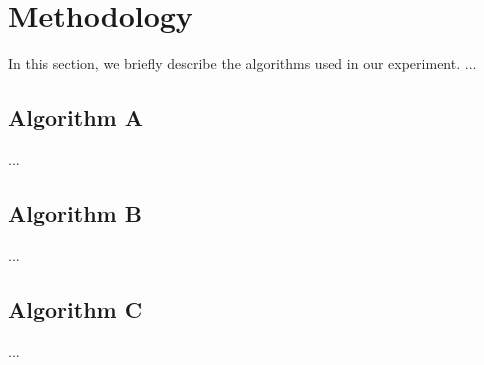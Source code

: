 \section{Methodology}
\label{sec:methodology}

In this section, we briefly describe the algorithms used in our experiment.
...


\subsection{Algorithm A}
...

\subsection{Algorithm B}
...

\subsection{Algorithm C}
...
